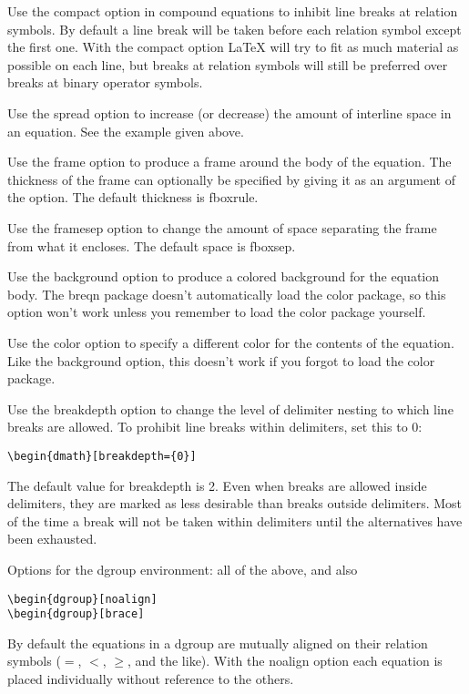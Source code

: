 \documentclass{article}
\def\latex/{{\protect\LaTeX}}
\newcommand{\ntt}{\normalfont\ttfamily}
\DeclareRobustCommand{\cs}[1]{{\ntt\ttbackslash#1}}
\let\cn=\cs
\DeclareRobustCommand{\pkg}[1]{{\ntt#1}}
\let\opt=\pkg \let\env=\pkg \let\fn=\pkg
\begin{document}
Use the \opt{compact} option in compound equations to inhibit line
breaks at relation symbols. By default a line break will be taken before
each relation symbol except the first one. With the \opt{compact} option
\latex/ will try to fit as much material as possible on each line, but
breaks at relation symbols will still be preferred over breaks at binary
operator symbols.

Use the \opt{spread} option to increase (or decrease) the amount of
interline space in an equation. See the example given above.

Use the \opt{frame} option to produce a frame around the body of the
equation. The thickness of the frame can optionally be specified by
giving it as an argument of the option. The default thickness is
\cn{fboxrule}.

Use the \opt{framesep} option to change the amount of space separating
the frame from what it encloses. The default space is \cn{fboxsep}.

Use the \opt{background} option to produce a colored background for the
equation body. The \pkg{breqn} package doesn't automatically load the
\pkg{color} package, so this option won't work unless you remember
to load the \pkg{color} package yourself.

Use the \opt{color} option to specify a different color for the contents
of the equation. Like the \opt{background} option, this doesn't work if
you forgot to load the \pkg{color} package.

Use the \opt{breakdepth} option to change the level of delimiter nesting
to which line breaks are allowed. To prohibit line breaks within
delimiters, set this to 0:
\begin{verbatim}
\begin{dmath}[breakdepth={0}]
\end{verbatim}
The default value for breakdepth is 2. Even when breaks are allowed
inside delimiters, they are marked as less desirable than breaks outside
delimiters. Most of the time a break will not be taken within delimiters
until the alternatives have been exhausted.

Options for the \env{dgroup} environment: all of the above, and also
\begin{verbatim}
\begin{dgroup}[noalign]
\begin{dgroup}[brace]
\end{verbatim}

By default the equations in a \env{dgroup} are mutually aligned on their
relation symbols ($=$, $<$, $\geq$, and the like). With the
\opt{noalign} option each equation is placed individually without
reference to the others.
\end{document}
